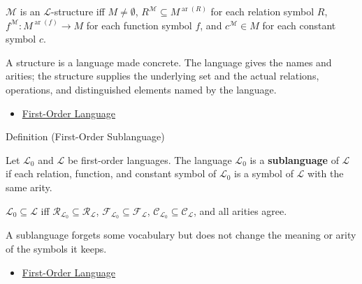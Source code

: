 \begin{remark*}
$\mathcal{M}$ is an $\mathcal{L}$-structure iff
$M\neq\emptyset$, $R^{\mathcal{M}}\subseteq M^{\operatorname{ar}(R)}$ for
each relation symbol $R$, $f^{\mathcal{M}}\colon
M^{\operatorname{ar}(f)}\to M$ for each function symbol $f$, and
$c^{\mathcal{M}}\in M$ for each constant symbol $c$.
\end{remark*}

\begin{remark*}[Interpretation]
A structure is a language made concrete. The language gives the names and
arities; the structure supplies the underlying set and the actual relations,
operations, and distinguished elements named by the language.
\end{remark*}

\begin{dependencies}
\begin{itemize}
  \item \hyperref[def:first-order-language]{First-Order Language}
\end{itemize}
\end{dependencies}

\begin{definitionbox}{Definition (First-Order Sublanguage)}
\begin{definition}\label{def:first-order-sublanguage}
Let $\mathcal{L}_0$ and $\mathcal{L}$ be first-order languages.
The language $\mathcal{L}_0$ is a \textbf{sublanguage} of $\mathcal{L}$ if
each relation, function, and constant symbol of $\mathcal{L}_0$ is a symbol of
$\mathcal{L}$ with the same arity.
\end{definition}
\end{definitionbox}

\begin{remark*}
$\mathcal{L}_0\subseteq\mathcal{L}$ iff
$\mathcal{R}_{\mathcal{L}_0}\subseteq\mathcal{R}_{\mathcal{L}}$,
$\mathcal{F}_{\mathcal{L}_0}\subseteq\mathcal{F}_{\mathcal{L}}$,
$\mathcal{C}_{\mathcal{L}_0}\subseteq\mathcal{C}_{\mathcal{L}}$, and all
arities agree.
\end{remark*}

\begin{remark*}[Interpretation]
A sublanguage forgets some vocabulary but does not change the meaning or arity
of the symbols it keeps.
\end{remark*}

\begin{dependencies}
\begin{itemize}
  \item \hyperref[def:first-order-language]{First-Order Language}
\end{itemize}
\end{dependencies}

